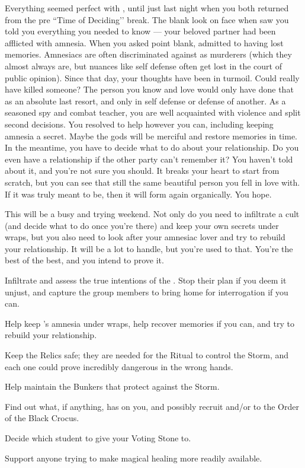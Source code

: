\documentclass[char]{GL2020}
\begin{document}
Everything seemed perfect with \cLibrarian{}, until just last night when you both returned from the pre ``Time of Deciding’’ break. The blank look on \cLibrarian{\their} face when \cLibrarian{\they} saw you told you everything you needed to know — your beloved partner had been afflicted with amnesia. When you asked \cLibrarian{\them} point blank, \cLibrarian{\they} admitted to having lost \cLibrarian{\their} memories. Amnesiacs are often discriminated against as murderers (which they almost always are, but nuances like self defense often get lost in the court of public opinion). Since that day, your thoughts have been in turmoil. Could \cLibrarian{} really have killed someone? The person you know and love would only have done that as an absolute last resort, and only in self defense or defense of another. As a seasoned spy and combat teacher, you are well acquainted with violence and split second decisions. You resolved to help \cLibrarian{} however you can, including keeping \cLibrarian{\their} amnesia a secret. Maybe the gods will be merciful and restore \cLibrarian{\their} memories in time. In the meantime, you have to decide what to do about your relationship. Do you even have a relationship if the other party can't remember it? You haven't told \cLibrarian{\them} about it, and you're not sure you should. It breaks your heart to start from scratch, but you can see that \cLibrarian{\theyare} still the same beautiful person you fell in love with. If it was truly meant to be, then it will form again organically. You hope.  

This will be a busy and trying weekend. Not only do you need to infiltrate a cult (and decide what to do once you're there) and keep your own secrets under wraps, but you also need to look after your amnesiac lover and try to rebuild your relationship. It will be a lot to handle, but you're used to that. You're the best of the best, and you intend to prove it.

\begin{itemz}
    \item Infiltrate and assess the true intentions of the \pGoaties{}. Stop their plan if you deem it unjust, and capture the group members to bring home for interrogation if you can.
    \item Help keep \cLibrarian{}'s amnesia under wraps, help \cLibrarian{\them} recover \cLibrarian{\their} memories if you can, and try to rebuild your relationship.
    \item Keep the Relics safe; they are needed for the Ritual to control the Storm, and each one could prove incredibly dangerous in the wrong hands.
    \item Help \cBunker{} maintain the Bunkers that protect against the Storm.
    \item Find out what, if anything, \cLibAssist{} has on you, and possibly recruit \cLibAssist{\them} and/or \cPirateChild{} to the Order of the Black Crocus.
    \item Decide which student to give your Voting Stone to.
    \item Support anyone trying to make magical healing more readily available.
\end{itemz}
\end{document}
